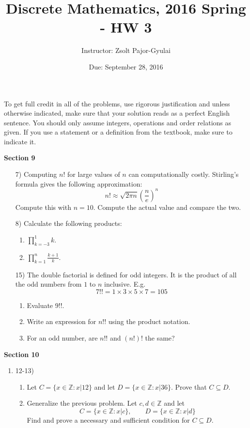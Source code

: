 \documentclass[11pt]{preprint}
\title{Discrete Mathematics, 2016 Spring - HW 3}
\author{Instructor: Zsolt Pajor-Gyulai}
\institute{Courant Institute of Mathematical Sciences, NYU}
\date{Due: September 28, 2016}
\def\enumb{\begin{enumerate}}
\def\enume{\end{enumerate}}
\def\integers{\mathbb{Z}}
\begin{document}
\maketitle

To get full credit  in all of the problems, use rigorous justification and unless otherwise indicated, make sure that your solution reads as a perfect English sentence. You should only assume integers, operations and order relations as given. If you use a statement or a definition from the textbook, make sure to indicate it.
\vspace{0.2cm}

\textbf{Section 9}

\begin{enumerate}
\item[7)] Computing $n!$ for large values of $n$ can computationally costly. Stirling's formula gives the following approximation:
\[
n!\approx \sqrt{2\pi n} \left(\frac{n}{e}\right)^n
\]
Compute this with $n=10$. Compute the actual value and compare the two.

\item[8)] Calculate the following products:
\begin{enumerate}
\item $\prod_{k=-3}^1k$.
\item $\prod_{k=1}^n\frac{k+1}{k}$.
\end{enumerate}

\item[15)] The double factorial is defined for odd integers. It is the product of all the odd numbers from $1$ to $n$ inclusive. E.g.
\[
7!!=1\times 3\times 5\times 7=105
\]
\begin{enumerate}
\item Evaluate $9!!$.
\item Write an expression for $n!!$ using the product notation.
\item For an odd number, are $n!!$ and $(n!)!$ the same?
\end{enumerate}

\end{enumerate}

\textbf{Section 10}

\enumb


\item[12-13)]
\enumb
\item Let $C=\{x\in\integers: x|12\}$ and let $D=\{x\in\integers: x|36\}$. Prove that $C\subseteq D$.
\item Generalize the previous problem. Let $c,d\in\integers$ and let
\[
C=\{x\in\integers: x|c\},\qquad D=\{x\in\integers: x|d\}
\]
Find and prove a necessary and sufficient condition for $C\subseteq D$.
\enume
\enume 
\end{document}
